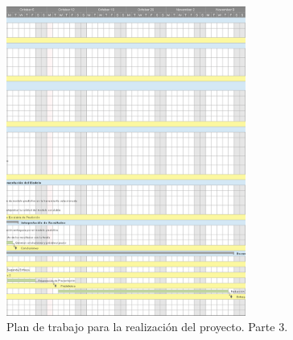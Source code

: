 \begin{figure}[H]
  \centering
    \includegraphics[width=0.7\textwidth]{Figuras/Gantt3}
      \caption{Plan de trabajo para la realización del proyecto. Parte 3.}
    \label{fig:cgantt3}
\end{figure}


